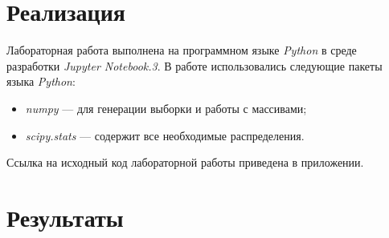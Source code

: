 \documentclass[12pt,a4paper]{article}
\begin{document}
	\section{Реализация}
	Лабораторная работа выполнена на программном языке \emph{Python} в среде разработки \emph{Jupyter Notebook.3}. В работе использовались следующие пакеты языка \emph{Python}:
	\begin{itemize}
		\item \emph{numpy} --- для генерации выборки и работы с массивами;
		\item \emph{scipy.stats} --- содержит все необходимые распределения.
	\end{itemize}
	Ссылка на исходный код лабораторной работы приведена в приложении.

	\newpage
	\section{Результаты}
\end{document}
